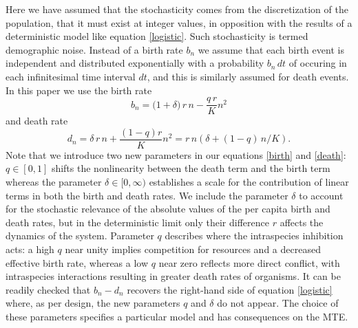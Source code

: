 Here we have assumed that the stochasticity comes from the discretization of the population, that it must exist at integer values, in opposition with the results of a deterministic model like equation \ref{logistic}.
Such stochasticity is termed demographic noise.
Instead of a birth rate $b_n$ we assume that each birth event is independent and distributed exponentially with a probability $b_n\,dt$ of occuring in each infinitesimal time interval $dt$, and this is similarly assumed for death events. %
In this paper we use the birth rate
\begin{equation}
 b_n = \Big(1 + \delta\Big)\,r\,n - \frac{q\,r}{K}n^2%
\label{birth}
\end{equation}
and death rate
\begin{equation}
 d_n = \delta\,r\,n + \frac{(1-q)r}{K} n^2 = r\,n\left(\delta+(1-q)\,n/K\right).
\label{death}
\end{equation}
Note that we introduce two new parameters in our equations \ref{birth} and \ref{death}: $q\in[0,1]$ shifts the nonlinearity between the death term and the birth term whereas the parameter $\delta\in[0,\infty)$ establishes a scale for the contribution of linear terms in both the birth and death rates.
We include the parameter $\delta$ to account for the stochastic relevance of the absolute values of the per capita birth and death rates, but in the deterministic limit only their difference $r$ affects the dynamics of the system.
Parameter $q$ describes where the intraspecies inhibition acts: a high $q$ near unity implies competition for resources and a decreased effective birth rate, whereas a low $q$ near zero reflects more direct conflict, with intraspecies interactions resulting in greater death rates of organisms.
It can be readily checked that $b_n-d_n$ recovers the right-hand side of equation \ref{logistic} where, as per design, the new parameters $q$ and $\delta$ do not appear.
The choice of these parameters specifies a particular model and has consequences on the MTE.


